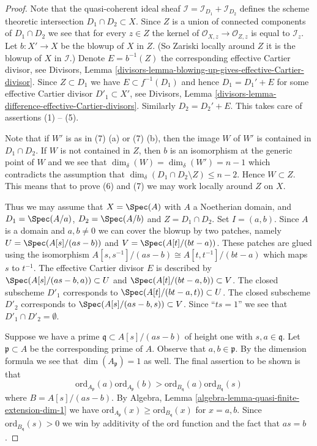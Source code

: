 \begin{proof}
Note that the quasi-coherent ideal sheaf
$\mathcal{I} = \mathcal{I}_{D_1} + \mathcal{I}_{D_2}$
defines the scheme theoretic intersection $D_1 \cap D_2 \subset X$.
Since $Z$ is a union of connected components of $D_1 \cap D_2$
we see that for every $z \in Z$ the kernel of
$\mathcal{O}_{X, z} \to \mathcal{O}_{Z, z}$ is equal to $\mathcal{I}_z$.
Let $b : X' \to X$ be the blowup of $X$ in $Z$. (So Zariski locally
around $Z$ it is the blowup of $X$ in $\mathcal{I}$.)
Denote $E = b^{-1}(Z)$ the corresponding effective Cartier divisor, see
Divisors,
Lemma \ref{divisors-lemma-blowing-up-gives-effective-Cartier-divisor}.
Since $Z \subset D_1$ we have $E \subset f^{-1}(D_1)$ and hence
$D_1 = D_1' + E$ for some effective Cartier divisor $D'_1 \subset X'$,
see Divisors, Lemma \ref{divisors-lemma-difference-effective-Cartier-divisors}.
Similarly $D_2 = D_2' + E$. This takes care of assertions (1) -- (5).

\medskip\noindent
Note that if $W'$ is as in (7) (a) or (7) (b), then the image $W$
of $W'$ is contained in $D_1 \cap D_2$. If $W$ is not contained in
$Z$, then $b$ is an isomorphism at the generic point of $W$ and
we see that $\dim_\delta(W) = \dim_\delta(W') = n - 1$ which
contradicts the assumption that
$\dim_\delta(D_1 \cap D_2 \setminus Z) \leq n - 2$.
Hence $W \subset Z$. This means that
to prove (6) and (7) we may work locally around $Z$ on $X$.

\medskip\noindent
Thus we may assume that $X = \Spec(A)$ with
$A$ a Noetherian domain, and $D_1 = \Spec(A/a)$,
$D_2 = \Spec(A/b)$ and $Z = D_1 \cap D_2$.
Set $I = (a, b)$. Since $A$ is a domain and $a, b \not = 0$ we can
cover the blowup by two patches, namely
$U = \Spec(A[s]/(as - b))$ and $V = \Spec(A[t]/(bt -a))$.
These patches are glued using the isomorphism
$A[s, s^{-1}]/(as - b) \cong A[t, t^{-1}]/(bt - a)$
which maps $s$ to $t^{-1}$.
The effective Cartier divisor $E$ is described by
$\Spec(A[s]/(as - b, a)) \subset U$ and
$\Spec(A[t]/(bt - a, b)) \subset V$.
The closed subscheme $D'_1$ corresponds to
$\Spec(A[t]/(bt - a, t)) \subset U$.
The closed subscheme $D'_2$ corresponds to
$\Spec(A[s]/(as -b, s)) \subset V$.
Since ``$ts = 1$'' we see that $D'_1 \cap D'_2 = \emptyset$.

\medskip\noindent
Suppose we have a prime $\mathfrak q \subset A[s]/(as - b)$
of height one with $s, a \in \mathfrak q$.
Let $\mathfrak p \subset A$ be the corresponding prime of $A$.
Observe that $a, b \in \mathfrak p$.
By the dimension formula we see that $\dim(A_{\mathfrak p}) = 1$
as well. The final assertion to be shown is that
$$
\text{ord}_{A_{\mathfrak p}}(a)
\text{ord}_{A_{\mathfrak p}}(b)
>
\text{ord}_{B_{\mathfrak q}}(a)
\text{ord}_{B_{\mathfrak q}}(s)
$$
where $B = A[s]/(as - b)$. By
Algebra, Lemma \ref{algebra-lemma-quasi-finite-extension-dim-1}
we have $\text{ord}_{A_{\mathfrak p}}(x) \geq \text{ord}_{B_{\mathfrak q}}(x)$
for $x = a, b$. Since $\text{ord}_{B_{\mathfrak q}}(s) > 0$ we win
by additivity of the $\text{ord}$ function and the fact that
$as = b$.
\end{proof}

